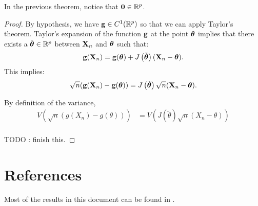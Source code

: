 \documentclass{article}
\begin{document}
In the previous theorem, notice that ${\bf 0}\in\mathbb{R}^p$. 

\begin{proof}
By hypothesis, we have ${\bf g}\in C^1(\mathbb{R}^p)$ so that we can apply Taylor's theorem. 
Taylor's expansion of the function ${\bf g}$ at the point $\boldsymbol{\theta}$ implies that there exists a $\tilde{\boldsymbol{\theta}}\in \mathbb{R}^p$ between 
${\bf X}_n$ and $\boldsymbol{\theta}$ such that:
$$
{\bf g}({\bf X}_n) = {\bf g}(\boldsymbol{\theta}) + J\left(\tilde{\boldsymbol{\theta}}\right) ({\bf X}_n-\boldsymbol{\theta}).
$$
This implies:
\begin{align}
\label{eq-multivdelmeth2}
\sqrt{n} ({\bf g}({\bf X}_n) - {\bf g}(\boldsymbol{\theta})) = J\left(\tilde{\boldsymbol{\theta}}\right) \sqrt{n} ({\bf X}_n-\boldsymbol{\theta}).
\end{align}

By definition of the variance, 
\begin{align*}
V\left(\sqrt{n} (g(X_n) - g(\theta))\right) 
&= V\left(J\left(\tilde{\theta}\right) \sqrt{n} (X_n-\theta) \right) \\
\end{align*}

TODO : finish this.
\end{proof}


\section{References}

Most of the results in this document can be found in \cite{Vaart2000}.





\end{document}
